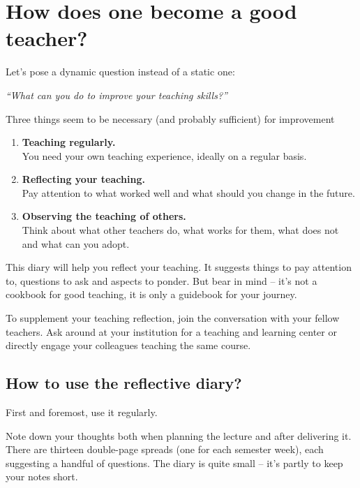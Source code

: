 
\chapter*{How does one become a good teacher?}

\vspace*{1em}
Let's pose a dynamic question instead of a static one:

\vspace*{1em}
\textit{\large \enquote{What can you do to improve your teaching skills?}}

\vspace*{1em}
Three things seem to be necessary (and probably sufficient) for improvement\footnotemark
{}
\begin{enumerate}
\item \textbf{Teaching regularly.}\\You need your own teaching experience, ideally on a regular basis.
\item \textbf{Reflecting your teaching.}\\Pay attention to what worked well and what should you change in the future.
\item \textbf{Observing the teaching of others.}\\Think about what other teachers do, what works for them, what does not and what can you adopt.
\end{enumerate}

This diary will help you reflect your teaching. It suggests things to pay attention to, questions to ask and aspects to ponder. But bear in mind -- it's not a cookbook for good teaching, it is only a guidebook for your journey.

To supplement your teaching reflection, join the conversation with your fellow teachers. Ask around at your institution for a teaching and learning center or directly engage your colleagues teaching the same course.

\newpage
\section*{How to use the reflective diary?}

First and foremost, use it regularly.

Note down your thoughts both when planning the lecture and after delivering it. There are thirteen double-page spreads (one for each semester week), each suggesting a handful of questions. The diary is quite small -- it's partly to keep your notes short.

